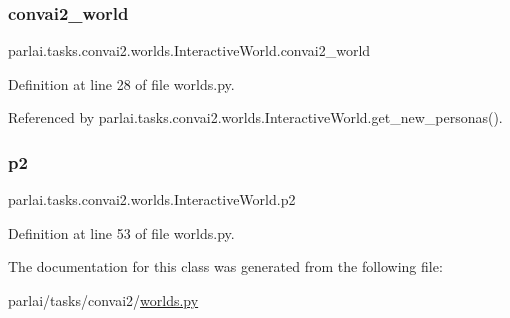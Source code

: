 \subsubsection{\texorpdfstring{convai2\+\_\+world}{convai2\_world}}
{\footnotesize\ttfamily parlai.\+tasks.\+convai2.\+worlds.\+Interactive\+World.\+convai2\+\_\+world}



Definition at line 28 of file worlds.\+py.



Referenced by parlai.\+tasks.\+convai2.\+worlds.\+Interactive\+World.\+get\+\_\+new\+\_\+personas().

\mbox{\label{classparlai_1_1tasks_1_1convai2_1_1worlds_1_1InteractiveWorld_a8f91a884b0bcb293335e3b7cb6404a1f}} 
\subsubsection{\texorpdfstring{p2}{p2}}
{\footnotesize\ttfamily parlai.\+tasks.\+convai2.\+worlds.\+Interactive\+World.\+p2}



Definition at line 53 of file worlds.\+py.



The documentation for this class was generated from the following file\+:\begin{DoxyCompactItemize}
\item 
parlai/tasks/convai2/\hyperlink{parlai_2tasks_2convai2_2worlds_8py}{worlds.\+py}\end{DoxyCompactItemize}
